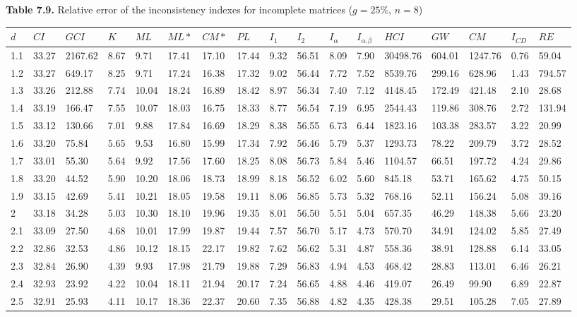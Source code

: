 \newpage
\textbf{Table 7.9.} Relative error of the inconsistency indexes for incomplete matrices ($g=25\%$, $n=8$)
\begin{adjustbox}{angle=90}
  \begin{center}
    \begin{tabular}{|l|llllllllllllllll|}
      \hline $d$ &
$CI$&$	\textit{GCI}$&$K$&$ML$&$ML*$&$CM*$&$PL$&$I_1$&$I_2$&$I_{\alpha}$&$I_{\alpha.\beta}$&$HCI$&$GW$&$CM$&$I_{CD}$&$RE$\\ \hline \hline
1.1&33.27&2167.62&8.67&9.71&17.41&17.10&17.44&9.32&56.51&8.09&7.90&30498.76&604.01&1247.76&0.76&59.04  \\ 
1.2&33.27&649.17&8.25&9.71&17.24&16.38&17.32&9.02&56.44&7.72&7.52&8539.76&299.16&628.96&1.43&794.57  \\ 
1.3&33.26&212.88&7.74&10.04&18.24&16.89&18.42&8.97&56.34&7.40&7.12&4148.45&172.49&421.48&2.10&28.68  \\ 
1.4&33.19&166.47&7.55&10.07&18.03&16.75&18.33&8.77&56.54&7.19&6.95&2544.43&119.86&308.76&2.72&131.94  \\ 
1.5&33.12&130.66&7.01&9.88&17.84&16.69&18.29&8.38&56.55&6.73&6.44&1823.16&103.38&283.57&3.22&20.99  \\ 
1.6&33.20&75.84&5.65&9.53&16.80&15.99&17.34&7.92&56.46&5.79&5.37&1293.73&78.22&209.79&3.72&28.52  \\ 
1.7&33.01&55.30&5.64&9.92&17.56&17.60&18.25&8.08&56.73&5.84&5.46&1104.57&66.51&197.72&4.24&29.86  \\ 
1.8&33.20&44.52&5.90&10.20&18.06&18.73&18.99&8.18&56.52&6.02&5.60&845.18&53.71&165.62&4.75&50.15  \\ 
1.9&33.15&42.69&5.41&10.21&18.05&19.58&19.11&8.06&56.85&5.73&5.32&768.16&52.11&156.24&5.08&39.16  \\ 
2&33.18&34.28&5.03&10.30&18.10&19.96&19.35&8.01&56.50&5.51&5.04&657.35&46.29&148.38&5.66&23.20  \\ 
2.1&33.09&27.50&4.68&10.01&17.99&19.87&19.44&7.57&56.70&5.17&4.73&570.70&34.91&124.02&5.85&27.49  \\ 
2.2&32.86&32.53&4.86&10.12&18.15&22.17&19.82&7.62&56.62&5.31&4.87&558.36&38.91&128.88&6.14&33.05  \\ 
2.3&32.84&26.90&4.39&9.93&17.98&21.79&19.88&7.29&56.83&4.94&4.53&468.42&28.83&113.01&6.46&26.21  \\ 
2.4&32.93&23.92&4.22&10.04&18.11&21.94&20.17&7.24&56.65&4.88&4.46&419.07&26.49&99.90&6.89&22.87  \\ 
2.5&32.91&25.93&4.11&10.17&18.36&22.37&20.60&7.35&56.88&4.82&4.35&428.38&29.51&105.28&7.05&27.89  \\ 

\end{tabular}
\end{center}
\end{adjustbox}
